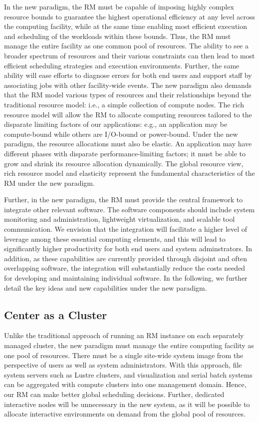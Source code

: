 \documentclass{article}
\begin{document}
In the new paradigm, the RM must be capable of imposing highly complex resource bounds
to guarantee the highest operational efficiency at any level
across the computing facility, while at the same time enabling most efficient execution
and scheduling of the workloads within these bounds.
Thus, the RM must manage the entire facility as one
common pool of resources. The ability to see a broader spectrum of resources 
and their various constraints can then lead to most efficient scheduling strategies
and execution environments. Further, the same ability will ease 
efforts to diagnose errors for both end users and support staff
by associating jobs with other facility-wide events. 
The new paradigm also demands that the RM model
various types of resources and their relationships beyond the traditional resource model:
i.e., a simple collection of compute nodes.
The rich resource model will allow the RM to allocate computing resources
tailored to the disparate limiting factors of our applications: e.g.,
an application may be compute-bound while others are I/O-bound or power-bound.
Under the new paradigm, the resource allocations must also be elastic. 
An application may have different phases with disparate performance-limiting factors;
it must be able to grow and shrink its resource allocation dynamically. 
The global resource view, rich resource model and elasticity represent
the fundamental characteristics of the RM under the new paradigm.

Further, in the new paradigm, the RM must provide the central framework to integrate
other relevant software. The software components should include   
system monitoring and administration, lightweight virtualization, 
and scalable tool communication. We envision that the integration will 
facilitate a higher level of leverage among these essential computing elements, 
and this will lead to significantly higher productivity 
for both end users and system adminstrators.  
In addition, as these capabilities are currently provided through disjoint
and often overlapping software, the integration will substantially reduce
the costs needed for developing and maintaining individual software.  
In the following, we further detail the key ideas and new capabilities 
under the new paradigm.


\subsection{Center as a Cluster}

Unlike the traditional approach of running an RM instance on each separately
managed cluster, 
the new paradigm must manage the
entire computing facility as one pool of resources. There must be a single site-wide 
system image from the perspective of users as well as system administrators.
With this approach, file system servers such as Lustre clusters, 
and visualization and serial batch systems can be aggregated
with compute clusters into one management domain. Hence,
our RM can make better global scheduling decisions. 
Further, dedicated interactive nodes will be unnecessary in the new system, as it
will be possible to allocate interactive environments on demand from the
global pool of resources.
\end{document}
